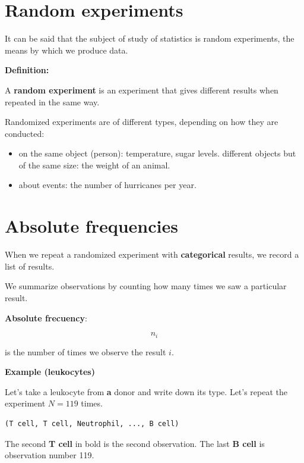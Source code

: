 \documentclass[
]{book}
\providecommand{\tightlist}{%
  \setlength{\itemsep}{0pt}\setlength{\parskip}{0pt}}
\begin{document}
\hypertarget{random-experiments}{%
\section{Random experiments}\label{random-experiments}}

It can be said that the subject of study of statistics is random experiments, the means by which we produce data.

\textbf{Definition:}

A \textbf{random experiment} is an experiment that gives different results when repeated in the same way.

Randomized experiments are of different types, depending on how they are conducted:

\begin{itemize}
\tightlist
\item
  on the same object (person): temperature, sugar levels.
  different objects but of the same size: the weight of an animal.
\item
  about events: the number of hurricanes per year.
\end{itemize}

\hypertarget{absolute-frequencies}{%
\section{Absolute frequencies}\label{absolute-frequencies}}

When we repeat a randomized experiment with \textbf{categorical} results, we record a list of results.

We summarize observations by counting how many times we saw a particular result.

\textbf{Absolute frecuency}:

\[ n_i \]

is the number of times we observe the result \(i\).

\newpage

\textbf{Example (leukocytes)}

Let's take a leukocyte from \textbf{a} donor and write down its type. Let's repeat the experiment \(N=119\) times.

\begin{verbatim}
(T cell, T cell, Neutrophil, ..., B cell)
\end{verbatim}

The second \textbf{T cell} in bold is the second observation. The last \textbf{B cell} is observation number 119.
\end{document}
